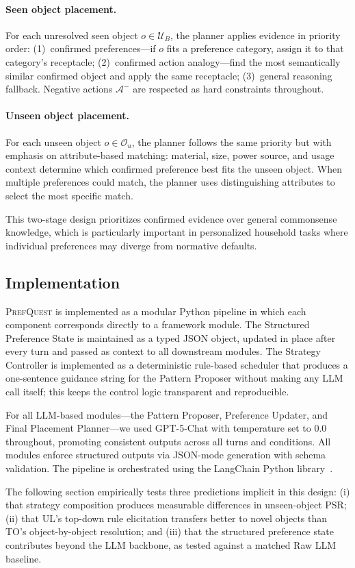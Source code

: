 \documentclass[manuscript,review,anonymous]{acmart}
\newcommand{\revend}{\color{black}}       %
\renewcommand{\revend}{}
\begin{document}
{\paragraph{Seen object placement.} For each unresolved seen object $o \in \mathcal{U}_B$, the planner applies evidence in priority order: (1)~confirmed preferences---if $o$ fits a preference category, assign it to that category's receptacle; (2)~confirmed action analogy---find the most semantically similar confirmed object and apply the same receptacle; (3)~general reasoning fallback. Negative actions $\mathcal{A}^-$ are respected as hard constraints throughout.

\paragraph{Unseen object placement.} For each unseen object $o \in \mathcal{O}_u$, the planner follows the same priority but with emphasis on attribute-based matching: material, size, power source, and usage context determine which confirmed preference best fits the unseen object. When multiple preferences could match, the planner uses distinguishing attributes to select the most specific match.

This two-stage design prioritizes confirmed evidence over general commonsense knowledge, which is particularly important in personalized household tasks where individual preferences may diverge from normative defaults.

\subsection{Implementation}

\textsc{PrefQuest} is implemented as a modular Python pipeline in which each component corresponds directly to a framework module. The Structured Preference State is maintained as a typed JSON object, updated in place after every turn and passed as context to all downstream modules. The Strategy Controller is implemented as a deterministic rule-based scheduler that produces a one-sentence guidance string for the Pattern Proposer without making any LLM call itself; this keeps the control logic transparent and reproducible.

For all LLM-based modules---the Pattern Proposer, Preference Updater, and Final Placement Planner---we used GPT-5-Chat with temperature set to 0.0 throughout, promoting consistent outputs across all turns and conditions. All modules enforce structured outputs via JSON-mode generation with schema validation. The pipeline is orchestrated using the LangChain Python library~\cite{langchain2023}.

The following section empirically tests three predictions implicit in this design: (i) that strategy composition produces measurable differences in unseen-object PSR; (ii) that UL's top-down rule elicitation transfers better to novel objects than TO's object-by-object resolution; and (iii) that the structured preference state contributes beyond the LLM backbone, as tested against a matched Raw LLM baseline.

\revend}
\end{document}
